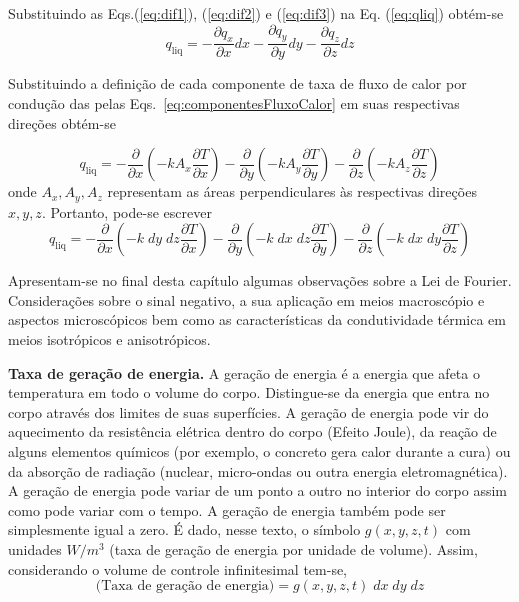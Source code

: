 Substituindo as Eqs.(\ref{eq:dif1}),  (\ref{eq:dif2}) e (\ref{eq:dif3}) na Eq. (\ref{eq:qliq}) obtém-se
\begin{equation}
	q_{\text{liq}} =
	- \frac{\partial q_x}{\partial x} dx 
	- \frac{\partial q_y}{\partial y} dy 
	- \frac{\partial q_z}{\partial z} dz 
\end{equation}

Substituindo a definição de cada componente de taxa de fluxo de calor por condução das pelas Eqs.~\ref{eq:componentesFluxoCalor} em suas respectivas direções obtém-se

\begin{equation}
	q_{\text{liq}}=
	- \frac{\partial}{\partial x} \left( - k A_x \frac{\partial T}{\partial x} \right) 
	- \frac{\partial}{\partial y} \left( - k A_y \frac{\partial T}{\partial y} \right)  
	- \frac{\partial}{\partial z} \left( - k A_z \frac{\partial T}{\partial z} \right)   
\end{equation}
onde $A_x, A_y, A_z$ representam as áreas perpendiculares às respectivas direções $x, y, z$. Portanto, pode-se escrever
\begin{equation}\label{eq:Fourierdif1}
	q_{\text{liq}}=
	- \frac{\partial}{\partial x} \left( - k\;dy\;dz \frac{\partial T}{\partial x} \right)  
	- \frac{\partial}{\partial y} \left( - k\;dx\;dz \frac{\partial T}{\partial y} \right)  
	- \frac{\partial}{\partial z} \left( - k\;dx\;dy \frac{\partial T}{\partial z} \right)  
\end{equation}

Apresentam-se no final desta capítulo algumas observações sobre a Lei de Fourier. Considerações sobre o sinal negativo, a sua aplicação em meios macroscópio e aspectos microscópicos bem como as características da condutividade térmica em meios isotrópicos e anisotrópicos.

\textbf{Taxa de geração de energia.} A geração de energia é a energia que afeta o temperatura em todo o volume do corpo. Distingue-se da energia que entra no corpo através dos limites de suas superfícies. A geração de energia pode vir do aquecimento da resistência elétrica dentro do corpo (Efeito Joule), da reação de alguns elementos químicos (por exemplo, o concreto gera calor durante a cura) ou da absorção de radiação (nuclear, micro-ondas ou outra energia eletromagnética). A geração de energia pode variar de um ponto a outro no interior do corpo assim como pode variar com o tempo. A geração de energia também pode ser simplesmente igual a zero. É dado, nesse texto, o símbolo $g(x, y, z, t)$ com unidades $W/m^3$ (taxa de geração de energia por unidade de volume). Assim, considerando o volume de controle infinitesimal tem-se,	
\begin{equation}
	\label{eq:qg}	
	\text{(Taxa de geração de energia)}=g(x,y,z,t) \;dx \;dy \;dz
\end{equation}

